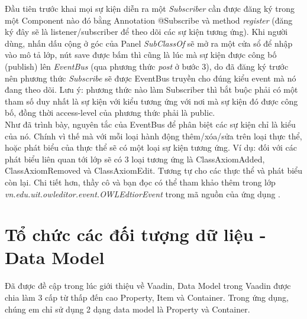 Đầu tiên trước khai mọi sự kiện diễn ra một \textit{Subscriber} cần được đăng ký trong một Component nào đó bằng Annotation @Subscribe và method \textit{register} (đăng ký đây sẽ là listener/subscriber để theo dõi các sự kiện tương ứng). Khi người dùng, nhấn dấu cộng ở góc của Panel \textit{SubClassOf} sẽ mở ra một cửa sổ để nhập vào mô tả lớp, nút save được bấm thì cũng là lúc mà sự kiện được công bố (publish) lên \textit{EventBus} (qua phương thức \textit{post} ở bước 3), do đã đăng ký trước nên phương thức \textit{Subscribe} sẽ được EventBus truyền cho đúng kiểu event mà nó đang theo dõi. Lưu ý: phương thức nào làm Subscriber thì bắt buộc phải có một tham số duy nhất là sự kiện với kiểu tương ứng với nơi mà sự kiện đó được công bố, đồng thời access-level của phương thức phải là public.
\\
Như đã trình bày, nguyên tắc của EventBus để phân biệt các sự kiện chỉ là kiểu của nó. Chính vì thế mà với mỗi loại hành động thêm/xóa/sửa trên loại thực thể, hoặc phát biểu của thực thể sẽ có một loại sự kiện tương ứng. Ví dụ: đối với các phát biểu liên quan tới lớp sẽ có 3 loại tương ứng là ClassAxiomAdded, ClassAxiomRemoved và ClassAxiomEdit. Tương tự cho các thực thể và phát biểu còn lại. Chi tiết hơn, thầy cô và bạn đọc có thể tham khảo thêm trong lớp \textit{vn.edu.uit.owleditor.event.OWLEdtiorEvent} trong mã nguồn của ứng dụng \cite{owleditorSrc}.


\section{Tổ chức các đối tượng dữ liệu - Data Model}
Đã được đề cập trong lúc giới thiệu về Vaadin, Data Model trong Vaadin được chia làm 3 cấp từ thấp đến cao Property, Item và Container. Trong ứng dụng, chúng em chỉ sử dụng 2 dạng data model là Property và Container. 
